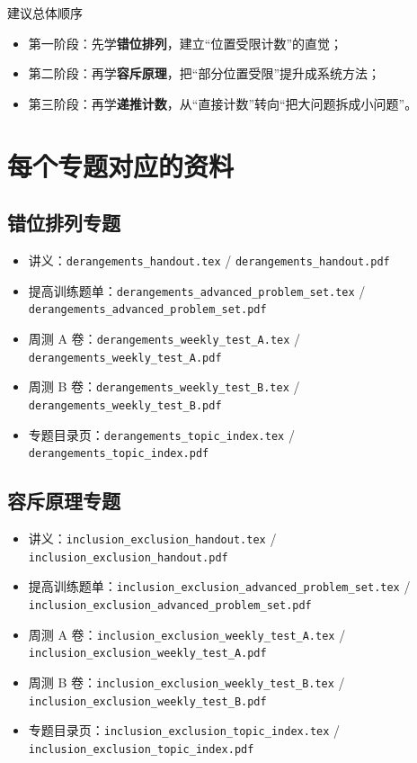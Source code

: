 \documentclass[11pt,a4paper,fontset=fandol]{ctexart}
\begin{document}
\begin{infobox}{建议总体顺序}
\begin{itemize}
  \item 第一阶段：先学\textbf{错位排列}，建立“位置受限计数”的直觉；
  \item 第二阶段：再学\textbf{容斥原理}，把“部分位置受限”提升成系统方法；
  \item 第三阶段：再学\textbf{递推计数}，从“直接计数”转向“把大问题拆成小问题”。
\end{itemize}
\end{infobox}

\section{每个专题对应的资料}

\subsection{错位排列专题}
\begin{itemize}
  \item 讲义：\texttt{derangements\_handout.tex} / \texttt{derangements\_handout.pdf}
  \item 提高训练题单：\texttt{derangements\_advanced\_problem\_set.tex} / \texttt{derangements\_advanced\_problem\_set.pdf}
  \item 周测 A 卷：\texttt{derangements\_weekly\_test\_A.tex} / \texttt{derangements\_weekly\_test\_A.pdf}
  \item 周测 B 卷：\texttt{derangements\_weekly\_test\_B.tex} / \texttt{derangements\_weekly\_test\_B.pdf}
  \item 专题目录页：\texttt{derangements\_topic\_index.tex} / \texttt{derangements\_topic\_index.pdf}
\end{itemize}

\subsection{容斥原理专题}
\begin{itemize}
  \item 讲义：\texttt{inclusion\_exclusion\_handout.tex} / \texttt{inclusion\_exclusion\_handout.pdf}
  \item 提高训练题单：\texttt{inclusion\_exclusion\_advanced\_problem\_set.tex} / \texttt{inclusion\_exclusion\_advanced\_problem\_set.pdf}
  \item 周测 A 卷：\texttt{inclusion\_exclusion\_weekly\_test\_A.tex} / \texttt{inclusion\_exclusion\_weekly\_test\_A.pdf}
  \item 周测 B 卷：\texttt{inclusion\_exclusion\_weekly\_test\_B.tex} / \texttt{inclusion\_exclusion\_weekly\_test\_B.pdf}
  \item 专题目录页：\texttt{inclusion\_exclusion\_topic\_index.tex} / \texttt{inclusion\_exclusion\_topic\_index.pdf}
\end{itemize}
\end{document}
